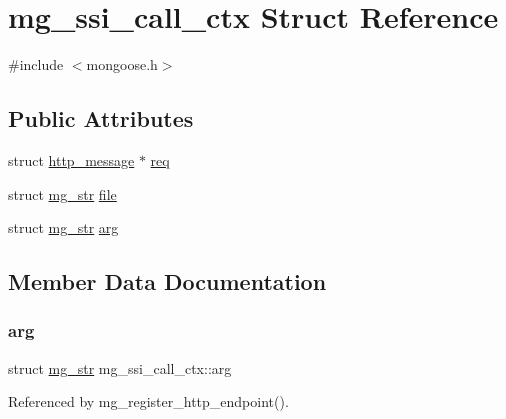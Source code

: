 \hypertarget{structmg__ssi__call__ctx}{}\section{mg\+\_\+ssi\+\_\+call\+\_\+ctx Struct Reference}
\label{structmg__ssi__call__ctx}


{\ttfamily \#include $<$mongoose.\+h$>$}

\subsection*{Public Attributes}
\begin{DoxyCompactItemize}
\item 
struct \hyperlink{structhttp__message}{http\+\_\+message} $\ast$ \hyperlink{structmg__ssi__call__ctx_ae4f6225598743855f1da5103a5640302_ae4f6225598743855f1da5103a5640302}{req}
\item 
struct \hyperlink{structmg__str}{mg\+\_\+str} \hyperlink{structmg__ssi__call__ctx_a87af9ab75f5b51b3c2237d20138dfda6_a87af9ab75f5b51b3c2237d20138dfda6}{file}
\item 
struct \hyperlink{structmg__str}{mg\+\_\+str} \hyperlink{structmg__ssi__call__ctx_a203dc7c3db2fe470b099ed54e5a0bfbf_a203dc7c3db2fe470b099ed54e5a0bfbf}{arg}
\end{DoxyCompactItemize}


\subsection{Member Data Documentation}
\mbox{\label{structmg__ssi__call__ctx_a203dc7c3db2fe470b099ed54e5a0bfbf_a203dc7c3db2fe470b099ed54e5a0bfbf}} 
\subsubsection{\texorpdfstring{arg}{arg}}
{\footnotesize\ttfamily struct \hyperlink{structmg__str}{mg\+\_\+str} mg\+\_\+ssi\+\_\+call\+\_\+ctx\+::arg}



Referenced by mg\+\_\+register\+\_\+http\+\_\+endpoint().

\mbox{\label{structmg__ssi__call__ctx_a87af9ab75f5b51b3c2237d20138dfda6_a87af9ab75f5b51b3c2237d20138dfda6}} 
